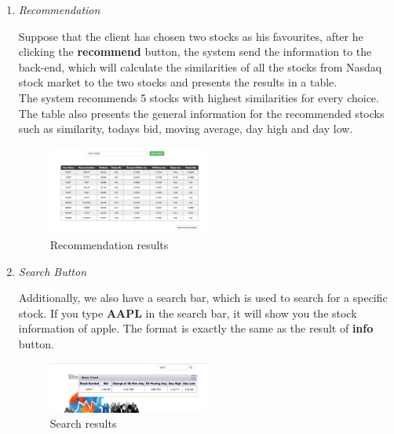 \documentclass[10pt, conference, compsocconf]{IEEEtran}
\begin{document}
\begin{enumerate}[label=\Alph*]
   
   

 
    
 \item  \textit{Recommendation}
 
          Suppose that the client has chosen two stocks as his favourites, after he clicking the \textbf{recommend} button, the system send the information to the back-end, which will calculate the similarities of all the stocks from Nasdaq stock market to the two stocks and presents the results in a table.\\
           
 The system recommends 5 stocks with highest similarities for every choice. The table also presents the general information for the recommended stocks such as similarity, todays bid, moving average, day high and day low.\\

  \begin{figure}[!h]
            \centering
           \includegraphics[width=0.5\textwidth]{figures/recommendation.jpg}
           \caption{Recommendation results}
          \vspace{0.1cm}
    \end{figure}

    
   \item  \textit{Search Button}

 Additionally, we also have a search bar, which is used to search for a specific stock.  If you type \textbf{AAPL} in the search bar, it will show you the stock information of apple. The format is exactly the same as the result of \textbf{info} button.\\
   \begin{figure}[!h]
            \centering
           \includegraphics[width=0.5\textwidth]{figures/search_button.jpg}
           \caption{Search results}
          \vspace{0.1cm}
    \end{figure}


\end{enumerate}
\end{document}
